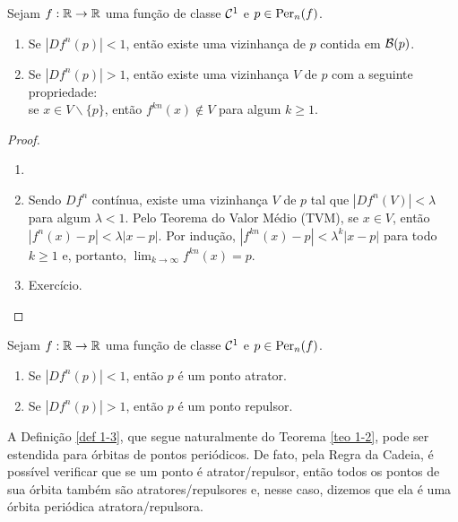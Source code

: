 \begin{theorem}\label{teo 1-2}
Sejam $f: \mathbb{R} \to \mathbb{R}$ uma função de classe $\mathcal{C}^1$ e $p \in \operatorname{Per}_n(f)$.
\begin{enumerate}
\item Se $|D f^n(p)| < 1$, então existe uma vizinhança de $p$ contida em $\mathcal{B}(p)$.
\item Se $|D f^n(p)| > 1$, então existe uma vizinhança $V$ de $p$ com a seguinte propriedade:\\se $x \in V \backslash \lbrace p \rbrace$, então  $f^{kn}(x) \notin V$ para algum $k \geq 1$. 
\end{enumerate}
\end{theorem}

\begin{proof}
\begin{enumerate}\item[]
\item Sendo $D f^n$ contínua, existe uma vizinhança $V$ de $p$ tal que $|D f^n(V)| < \lambda$ para algum $\lambda < 1$.
Pelo Teorema do Valor Médio (TVM), se $x \in V$, então $|f^n(x) - p| < \lambda|x - p|$.
Por indução, $|f^{kn}(x) - p| < \lambda^k|x - p|$ para todo $k \geq 1$ e, portanto, $\lim_{k \to \infty} f^{kn}(x) = p$.
\item Exercício.
\end{enumerate}
\end{proof}



\begin{definition}\label{def 1-3}
Sejam $f: \mathbb{R} \to \mathbb{R}$ uma função de classe $\mathcal{C}^1$ e $p \in \operatorname{Per}_n(f)$.
\begin{enumerate}[label=\roman*.]
\item Se $|D f^n(p)| < 1$, então $p$ é um ponto atrator.
\item Se $|D f^n(p)| > 1$, então $p$ é um ponto repulsor.
\end{enumerate}
\end{definition}

A Definição \ref{def 1-3}, que segue naturalmente do Teorema \ref{teo 1-2}, pode ser estendida para órbitas de pontos periódicos. De fato, pela Regra da Cadeia, é possível verificar que se um ponto é atrator/repulsor, então todos os pontos de sua órbita também são atratores/repulsores e, nesse caso, dizemos que ela é uma órbita periódica atratora/repulsora.
